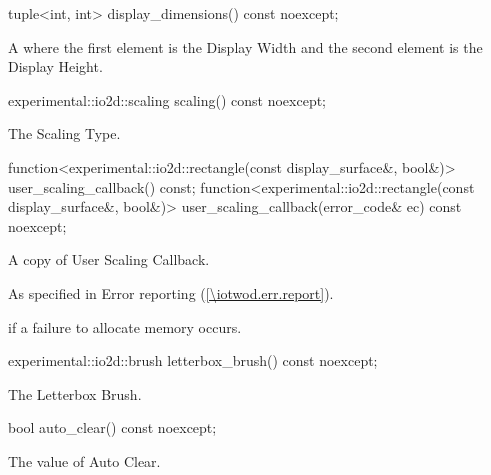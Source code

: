 \begin{itemdecl}
tuple<int, int> display_dimensions() const noexcept;
\end{itemdecl}
\begin{itemdescr}
\pnum
\returns
A  where the first element is the Display Width and the second element is the Display Height.
\end{itemdescr}

\begin{itemdecl}
experimental::io2d::scaling scaling() const noexcept;
\end{itemdecl}
\begin{itemdescr}
\pnum
\returns
The Scaling Type.
\end{itemdescr}

\begin{itemdecl}
function<experimental::io2d::rectangle(const display_surface&, bool&)>
  user_scaling_callback() const;
function<experimental::io2d::rectangle(const display_surface&, bool&)>
  user_scaling_callback(error_code& ec) const noexcept;
\end{itemdecl}
\begin{itemdescr}
\pnum
\returns
A copy of User Scaling Callback.

\pnum
\throws
As specified in Error reporting (\ref{\iotwod.err.report}).

\pnum
\errors
{} if a failure to allocate memory occurs.
\end{itemdescr}

\begin{itemdecl}
experimental::io2d::brush letterbox_brush() const noexcept;
\end{itemdecl}
\begin{itemdescr}
\pnum
\returns
The Letterbox Brush.
\end{itemdescr}

\begin{itemdecl}
bool auto_clear() const noexcept;
\end{itemdecl}
\begin{itemdescr}
\pnum
\returns
The value of Auto Clear.
\end{itemdescr}

